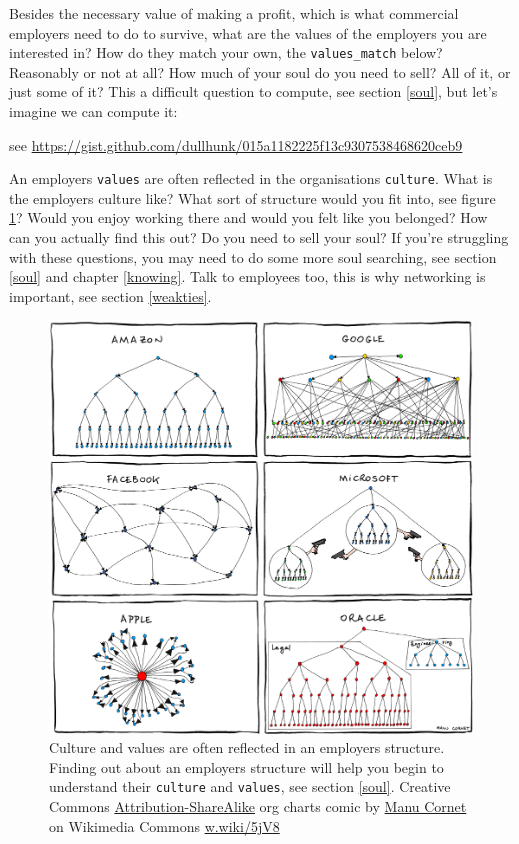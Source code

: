 \documentclass[
]{book}
\begin{document}
Besides the necessary value of making a profit, which is what commercial employers need to do to survive, what are the values of the employers you are interested in? How do they match your own, the \texttt{values\_match} below? Reasonably or not at all? How much of your soul do you need to sell? All of it, or just some of it? This a difficult question to compute, see section \ref{soul}, but let's imagine we can compute it:

see \url{https://gist.github.com/dullhunk/015a1182225f13c9307538468620ceb9}

An employers \texttt{values} are often reflected in the organisations \texttt{culture}. What is the employers culture like? What sort of structure would you fit into, see figure \ref{fig:pyramid-fig}? Would you enjoy working there and would you felt like you belonged? How can you actually find this out? Do you need to sell your soul? If you're struggling with these questions, you may need to do some more soul searching, see section \ref{soul} and chapter \ref{knowing}. Talk to employees too, this is why networking is important, see section \ref{weakties}.

\begin{figure}

{\centering \includegraphics[width=0.99\linewidth]{images/Manu_Cornet_pyramid} 

}

\caption{Culture and values are often reflected in an employers structure. Finding out about an employers structure will help you begin to understand their \texttt{culture} and \texttt{values}, see section \ref{soul}. Creative Commons \href{https://creativecommons.org/licenses/by-sa/3.0/deed.en}{Attribution-ShareAlike} org charts comic by \href{https://en.wikipedia.org/wiki/Manu_Cornet}{Manu Cornet} on Wikimedia Commons \href{https://w.wiki/5jV8}{w.wiki/5jV8}}\label{fig:pyramid-fig}
\end{figure}
\end{document}

